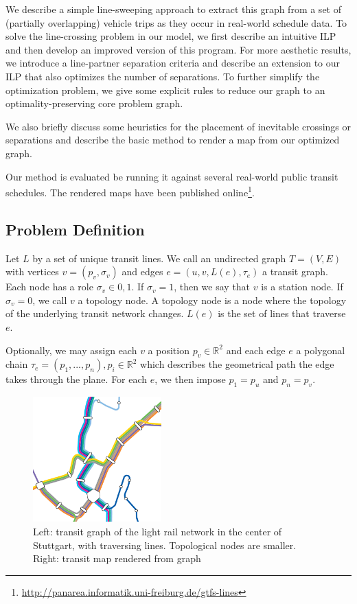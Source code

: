 \documentclass{llncs}
\begin{document}
We describe a simple line-sweeping approach to extract this graph from a set of (partially overlapping) vehicle trips as they occur in real-world schedule data. To solve the line-crossing problem in our model, we first describe an intuitive ILP and then develop an improved version of this program. For more aesthetic results, we introduce a line-partner separation criteria and describe an extension to our ILP that also optimizes the number of separations. To further simplify the optimization problem, we give some explicit rules to reduce our graph to an optimality-preserving core problem graph.

We also briefly discuss some heuristics for the placement of inevitable crossings or separations and describe the basic method to render a map from our optimized graph.

Our method is evaluated be running it against several real-world public transit schedules. The rendered maps have been published online\footnote{\url{http://panarea.informatik.uni-freiburg.de/gtfs-lines}}.

%
\subsection{Problem Definition}\label{SEC:def}
%
Let $L$ by a set of unique transit lines. We call an undirected graph $T = (V, E)$ with vertices $v = (p_v, \sigma_v)$ and edges $e = (u, v, L(e), \tau_e)$ a transit graph. Each node has a role $\sigma_v \in {0, 1}$. If $\sigma_v = 1$, then we say that $v$ is a station node. If $\sigma_v = 0$, we call $v$ a topology node. A topology node is a node where the topology of the underlying transit network changes. $L(e)$ is the set of lines that traverse $e$.

Optionally, we may assign each $v$ a position $p_v \in \mathbb{R}^2$ and each edge $e$ a polygonal chain $\tau_e = (p_1, ..., p_n), p_i \in \mathbb{R}^2$ which describes the geometrical path the edge takes through the plane. For each $e$, we then impose $p_1 = p_u$ and $p_n = p_v$.

\begin{figure}[t]
  \centering
	
	\hspace{.5cm}
    \includegraphics[trim={0cm 0 2.47cm 4.22cm},clip,width=0.44\textwidth]{render_examples/vvs_cropped.pdf}
	\caption{Left: transit graph of the light rail network in the center of Stuttgart, with traversing lines. Topological nodes are smaller. Right: transit map rendered from graph}
	\label{FIG:transitgraphvvs}
\end{figure}
\end{document}
